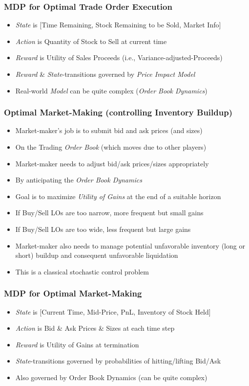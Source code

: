 \documentclass[handout]{beamer}
\begin{document}
\begin{frame}
\frametitle{MDP for Optimal Trade Order Execution}
\pause
\begin{itemize}[<+->]
\item {\em State} is [Time Remaining, Stock Remaining to be Sold, Market Info]
\item {\em Action} is Quantity of Stock to Sell at current time
\item {\em Reward} is Utility of Sales Proceeds (i.e., Variance-adjusted-Proceeds)
\item {\em Reward} \& {\em State}-transitions governed by {\em Price Impact Model}
\item Real-world {\em Model} can be quite complex ({\em Order Book Dynamics})
\end{itemize}
\end{frame}

\begin{frame}
\frametitle{Optimal Market-Making (controlling Inventory Buildup)}
\pause
\begin{itemize}[<+->]
\item Market-maker's job is to submit bid and ask prices (and sizes)
\item On the Trading {\em Order Book} (which moves due to other players)
\item Market-maker needs to adjust bid/ask prices/sizes appropriately
\item By anticipating the {\em Order Book Dynamics}
\item Goal is to maximize {\em Utility of Gains} at the end of a suitable horizon
\item If Buy/Sell LOs are too narrow, more frequent but small gains
\item If Buy/Sell LOs are too wide, less frequent but large gains
\item Market-maker also needs to manage potential unfavorable inventory (long or short) buildup and consequent unfavorable liquidation
\item This is a classical stochastic control problem
\end{itemize}
\end{frame}

\begin{frame}
\frametitle{MDP for Optimal Market-Making}
\pause
\begin{itemize}[<+->]
\item {\em State} is [Current Time, Mid-Price, PnL, Inventory of Stock Held]
\item {\em Action} is Bid \& Ask Prices \& Sizes at each time step
\item {\em Reward} is Utility of Gains at termination
\item {\em State}-transitions governed by probabilities of hitting/lifting Bid/Ask
\item Also governed by Order Book Dynamics (can be quite complex)
\end{itemize}
\end{frame}
\end{document}
